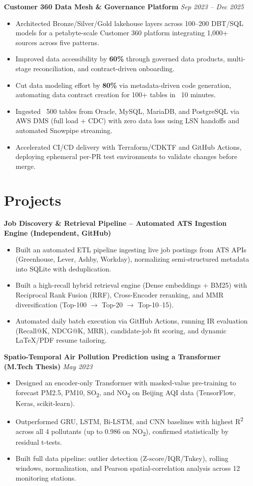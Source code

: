 \documentclass[10pt,a4paper]{article}
\newcommand{\proj}[2]{\vspace{2pt}\textbf{#1} \hfill \textit{#2}\par\vspace{-1pt}}
\begin{document}
\proj{Customer 360 Data Mesh \& Governance Platform}{Sep 2023 -- Dec 2025}
\begin{itemize}
\item Architected Bronze/Silver/Gold lakehouse layers across 100--200 DBT/SQL models for a petabyte-scale Customer 360 platform integrating 1,000+ sources across five patterns.
\item Improved data accessibility by \textbf{60\%} through governed data products, multi-stage reconciliation, and contract-driven onboarding.
\item Cut data modeling effort by \textbf{80\%} via metadata-driven code generation, automating data contract creation for 100+ tables in ~10 minutes.
\item Ingested ~500 tables from Oracle, MySQL, MariaDB, and PostgreSQL via AWS DMS (full load + CDC) with zero data loss using LSN handoffs and automated Snowpipe streaming.
\item Accelerated CI/CD delivery with Terraform/CDKTF and GitHub Actions, deploying ephemeral per-PR test environments to validate changes before merge.
\end{itemize}

\newpage
\section*{Projects}
\proj{Job Discovery \& Retrieval Pipeline -- Automated ATS Ingestion Engine (Independent, GitHub)}{}
\begin{itemize}
\item Built an automated ETL pipeline ingesting live job postings from ATS APIs (Greenhouse, Lever, Ashby, Workday), normalizing semi-structured metadata into SQLite with deduplication.
\item Built a high-recall hybrid retrieval engine (Dense embeddings + BM25) with Reciprocal Rank Fusion (RRF), Cross-Encoder reranking, and MMR diversification (Top-100 $\rightarrow$ Top-20 $\rightarrow$ Top-10--15).
\item Automated daily batch execution via GitHub Actions, running IR evaluation (Recall@K, NDCG@K, MRR), candidate-job fit scoring, and dynamic LaTeX/PDF resume tailoring.
\end{itemize}

\proj{Spatio-Temporal Air Pollution Prediction using a Transformer (M.Tech Thesis)}{May 2023}
\begin{itemize}
\item Designed an encoder-only Transformer with masked-value pre-training to forecast PM2.5, PM10, SO\textsubscript{2}, and NO\textsubscript{2} on Beijing AQI data (TensorFlow, Keras, scikit-learn).
\item Outperformed GRU, LSTM, Bi-LSTM, and CNN baselines with highest R\textsuperscript{2} across all 4 pollutants (up to 0.986 on NO\textsubscript{2}), confirmed statistically by residual t-tests.
\item Built full data pipeline: outlier detection (Z-score/IQR/Tukey), rolling windows, normalization, and Pearson spatial-correlation analysis across 12 monitoring stations.
\end{itemize}
\end{document}
